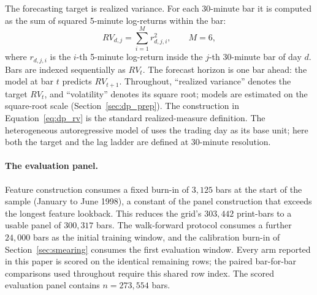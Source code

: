 The forecasting target is realized variance. For each 30-minute bar it is
computed as the sum of squared 5-minute log-returns within the bar:
\begin{equation}
    RV_{d,j} = \sum_{i=1}^{M} r_{d,j,i}^{2}, \qquad M = 6,
    \label{eq:dp_rv}
\end{equation}
where $r_{d,j,i}$ is the $i$-th 5-minute log-return inside the $j$-th
30-minute bar of day $d$. Bars are indexed sequentially as $RV_t$. The
forecast horizon is one bar ahead: the model at bar $t$ predicts
$RV_{t+1}$. Throughout, ``realized variance'' denotes the target $RV_t$,
and ``volatility'' denotes its square root; models are estimated on the
square-root scale (Section~\ref{sec:dp_prep}). The construction in
Equation~\eqref{eq:dp_rv} is the standard realized-measure definition. The
heterogeneous autoregressive model of \citet{Corsi2009} uses the trading
day as its base unit; here both the target and the lag ladder are defined
at 30-minute resolution.

\paragraph{The evaluation panel.}
Feature construction consumes a fixed burn-in of $3{,}125$ bars at the
start of the sample (January to June 1998), a constant of the panel
construction that exceeds the longest feature lookback. This reduces the
grid's $303{,}442$ print-bars to a usable panel of $300{,}317$ bars. The
walk-forward protocol consumes a further $24{,}000$ bars as the initial
training window, and the calibration burn-in of
Section~\ref{sec:smearing} consumes the first evaluation window. Every
arm reported in this paper is scored on the identical remaining rows; the
paired bar-for-bar comparisons used throughout require this shared row
index. The scored evaluation panel contains $n = 273{,}554$ bars.

